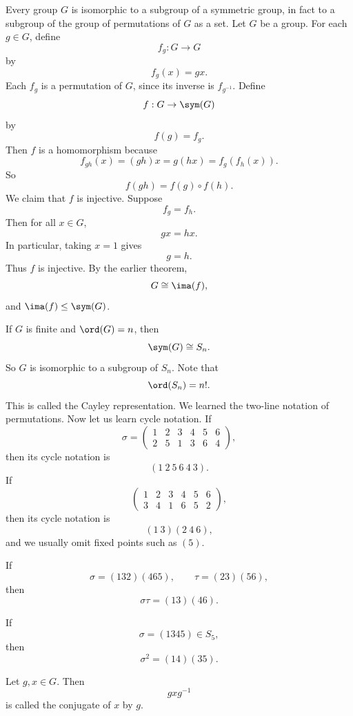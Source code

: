 \begin{theorem}{
    Every group $G$ is isomorphic to a subgroup of a symmetric group, in fact to a subgroup of the group of permutations of $G$ as a set.
}
    Let $G$ be a group.
    For each $g\in G$, define
    \[
        f_g:G\to G
    \]
    by
    \[
        f_g(x)=gx.
    \]
    Each $f_g$ is a permutation of $G$, since its inverse is $f_{g^{-1}}$.
    Define
    \[
        f:G\to \sym(G)
    \]
    by
    \[
        f(g)=f_g.
    \]
    Then $f$ is a homomorphism because
    \[
        f_{gh}(x)=(gh)x=g(hx)=f_g(f_h(x)).
    \]
    So
    \[
        f(gh)=f(g)\circ f(h).
    \]
    We claim that $f$ is injective.
    Suppose
    \[
        f_g=f_h.
    \]
    Then for all $x\in G$,
    \[
        gx=hx.
    \]
    In particular, taking $x=1$ gives
    \[
        g=h.
    \]
    Thus $f$ is injective.
    By the earlier theorem,
    \[
        G\cong \ima(f),
    \]
    and $\ima(f)\leq \sym(G)$.
\end{theorem}

If $G$ is finite and $\ord(G)=n$, then
\[
    \sym(G)\cong S_n.
\]
So $G$ is isomorphic to a subgroup of $S_n$.
Note that
\[
    \ord(S_n)=n!.
\]
This is called the Cayley representation.
We learned the two-line notation of permutations.
Now let us learn cycle notation.
If
\[
    \sigma=
    \begin{pmatrix}
        1&2&3&4&5&6\\
        2&5&1&3&6&4
    \end{pmatrix},
\]
then its cycle notation is
\[
    (1\ 2\ 5\ 6\ 4\ 3).
\]
If
\[
    \begin{pmatrix}
        1&2&3&4&5&6\\
        3&4&1&6&5&2
    \end{pmatrix},
\]
then its cycle notation is
\[
    (1\ 3)(2\ 4\ 6),
\]
and we usually omit fixed points such as $(5)$.

\begin{example}
    If
    \[
        \sigma=(132)(465),
        \qquad
        \tau=(23)(56),
    \]
    then
    \[
        \sigma\tau=(13)(46).
    \]
\end{example}

\begin{example}
    If
    \[
        \sigma=(1345)\in S_5,
    \]
    then
    \[
        \sigma^2=(14)(35).
    \]
\end{example}

\begin{definition}[Conjugate]
    Let $g,x\in G$.
    Then
    \[
        gxg^{-1}
    \]
    is called the conjugate of $x$ by $g$.
\end{definition}

